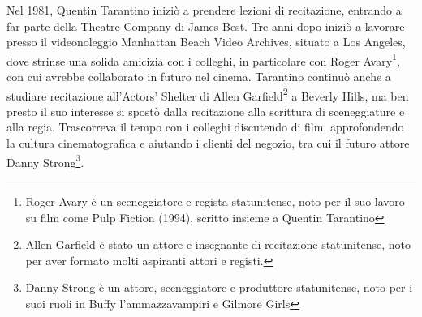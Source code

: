 \documentclass[12pt]{article} %
\begin{document}
\begin{flushleft}
    Nel 1981, Quentin Tarantino iniziò a prendere lezioni di recitazione, entrando a far parte della Theatre Company di James Best.
    Tre anni dopo iniziò a lavorare presso il videonoleggio Manhattan Beach Video Archives, situato a Los Angeles, dove strinse una solida amicizia con i colleghi, in particolare con Roger Avary\footnote{Roger Avary è un sceneggiatore e regista statunitense, noto per il suo lavoro su film come Pulp Fiction (1994), scritto insieme a Quentin Tarantino}, con cui avrebbe collaborato in futuro nel cinema. 
    Tarantino continuò anche a studiare recitazione all'Actors' Shelter di Allen Garfield\footnote{Allen Garfield è stato un attore e insegnante di recitazione statunitense, noto per aver formato molti aspiranti attori e registi.} a Beverly Hills, ma ben presto il suo interesse si spostò dalla recitazione alla scrittura di sceneggiature e alla regia. 
    Trascorreva il tempo con i colleghi discutendo di film, approfondendo la cultura cinematografica e aiutando i clienti del negozio, tra cui il futuro attore Danny Strong\footnote{Danny Strong è un attore, sceneggiatore e produttore statunitense, noto per i suoi ruoli in Buffy l'ammazzavampiri e Gilmore Girls}.
\end{flushleft}
\break
\end{document}
